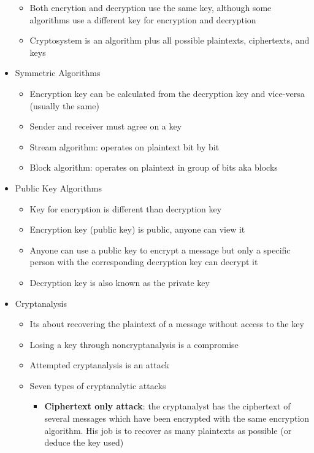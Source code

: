 \documentclass[]{article}
\begin{document}
\begin{itemize}
\begin{itemize}
        \item Both encrytion and decryption use the same key, although some algorithms use a different key for encryption and decryption
        \item Cryptosystem is an algorithm plus all possible plaintexts, ciphertexts, and keys
    \end{itemize}
    \item Symmetric Algorithms
    \begin{itemize}
        \item Encryption key can be calculated from the decryption key and vice-versa (usually the same)
        \item Sender and receiver must agree on a key
        \item Stream algorithm: operates on plaintext bit by bit
        \item Block algorithm: operates on plaintext in group of bits aka blocks
    \end{itemize}
    \item Public Key Algorithms
    \begin{itemize}
        \item Key for encryption is different than decryption key
        \item Encryption key (public key) is public, anyone can view it
        \item Anyone can use a public key to encrypt a message but only a specific person with the corresponding decryption key can decrypt it
        \item Decryption key is also known as the private key
    \end{itemize}
    \item Cryptanalysis
    \begin{itemize}
        \item Its about recovering the plaintext of a message without access to the key
        \item Losing a key through noncryptanalysis is a compromise
        \item Attempted cryptanalysis is an attack
        \item Seven types of cryptanalytic attacks
        \begin{itemize}
            \item \textbf{Ciphertext only attack}: the cryptanalyst has the ciphertext of several messages which have been encrypted with the same encryption algorithm. His job is to recover as many plaintexts as possible (or deduce the key used)

\end{itemize}
\end{itemize}
\end{itemize}
\end{document}
